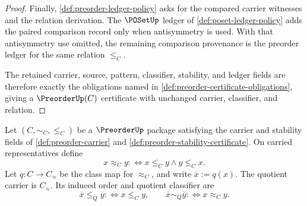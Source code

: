 \begin{proof}
Finally, \autoref{def:preorder-ledger-policy} asks for the compared carrier witnesses and the relation derivation. The $\POSetUp$ ledger of \autoref{def:poset-ledger-policy} adds the paired comparison record only when antisymmetry is used. With that antisymmetry use omitted, the remaining comparison provenance is the preorder ledger for the same relation $\le_C$.

The retained carrier, source, pattern, classifier, stability, and ledger fields are therefore exactly the obligations named in \autoref{def:preorder-certificate-obligations}, giving a $\PreorderUp(C)$ certificate with unchanged carrier, classifier, and relation.
\end{proof}

\begin{definition}
\label{def:preorder-quotient-presentation}
Let $(C,\sim_C,\le_C)$ be a $\PreorderUp$ package satisfying the carrier and stability fields of \autoref{def:preorder-carrier} and \autoref{def:preorder-stability-certificate}. On carried representatives define
$$
x\approx_C y :\Leftrightarrow x\le_C y\land y\le_C x.
$$
Let $q:C\to C_{\!\approx}$ be the class map for $\approx_C$, and write $\overline{x}:=q(x)$. The quotient carrier is $C_{\!\approx}$. Its induced order and quotient classifier are
$$
\overline{x}\le_Q\overline{y} :\Leftrightarrow x\le_C y,
\qquad
\overline{x}\sim_Q\overline{y} :\Leftrightarrow x\approx_C y.
$$
\end{definition}

